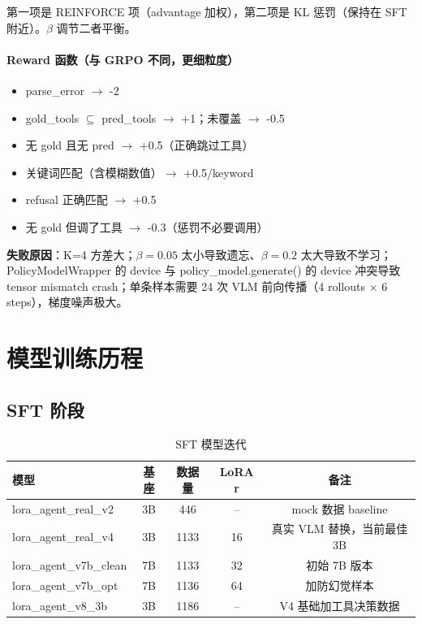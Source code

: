\documentclass[12pt,a4paper]{ctexart}
\begin{document}
第一项是 REINFORCE 项（advantage 加权），第二项是 KL 惩罚（保持在 SFT 附近）。$\beta$ 调节二者平衡。

\paragraph{Reward 函数（与 GRPO 不同，更细粒度）}
\begin{itemize}[nosep]
  \item parse\_error $\rightarrow$ -2
  \item gold\_tools $\subseteq$ pred\_tools $\rightarrow$ +1；未覆盖 $\rightarrow$ -0.5
  \item 无 gold 且无 pred $\rightarrow$ +0.5（正确跳过工具）
  \item 关键词匹配（含模糊数值）$\rightarrow$ +0.5/keyword
  \item refusal 正确匹配 $\rightarrow$ +0.5
  \item 无 gold 但调了工具 $\rightarrow$ -0.3（惩罚不必要调用）
\end{itemize}

\textbf{失败原因}：K=4 方差大；$\beta=0.05$ 太小导致遗忘、$\beta=0.2$ 太大导致不学习；PolicyModelWrapper 的 device 与 policy\_model.generate() 的 device 冲突导致 tensor mismatch crash；单条样本需要 24 次 VLM 前向传播（4 rollouts × 6 steps），梯度噪声极大。

\section{模型训练历程}

\subsection{SFT 阶段}

\begin{table}[H]
\centering
\caption{SFT 模型迭代}
\begin{tabular}{lcccc}
\toprule
模型 & 基座 & 数据量 & LoRA r & 备注 \\
\midrule
lora\_agent\_real\_v2 & 3B & 446 & -- & mock 数据 baseline \\
lora\_agent\_real\_v4 & 3B & 1133 & 16 & 真实 VLM 替换，当前最佳 3B \\
lora\_agent\_v7b\_clean & 7B & 1133 & 32 & 初始 7B 版本 \\
lora\_agent\_v7b\_opt & 7B & 1136 & 64 & 加防幻觉样本 \\
lora\_agent\_v8\_3b & 3B & 1186 & -- & V4 基础加工具决策数据 \\
\bottomrule
\end{tabular}
\end{table}
\end{document}

